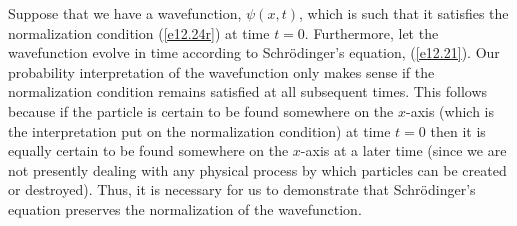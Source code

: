 Suppose that we have a wavefunction, $\psi(x,t)$, which is such that it satisfies the normalization condition (\ref{e12.24r})
at time $t=0$. Furthermore, let the wavefunction evolve in time according to Schr\"{o}dinger's equation, (\ref{e12.21}). 
Our probability interpretation of the wavefunction only makes sense if the normalization
condition remains satisfied at all subsequent times. This follows because if the particle is certain to be
found somewhere on the $x$-axis  (which is the interpretation put on the normalization condition) at time $t=0$ then
it is equally certain to be found somewhere on the $x$-axis at a later time (since we are not presently dealing with any
physical process by which particles can be created or destroyed). Thus, it is necessary for us to demonstrate that
Schr\"{o}dinger's equation preserves the normalization of the wavefunction.

